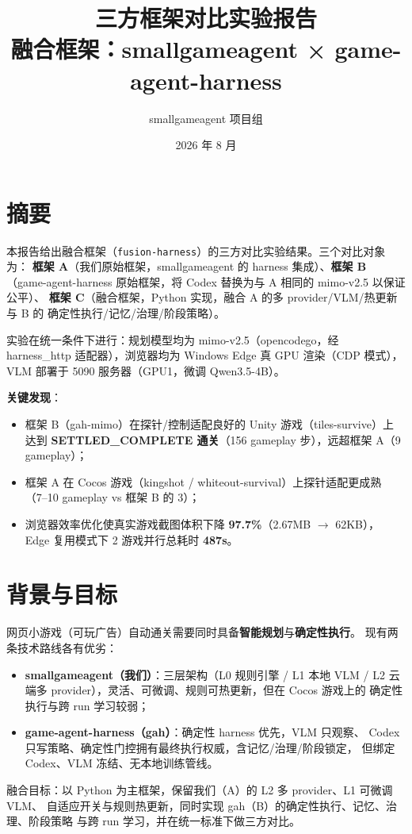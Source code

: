 \documentclass[11pt,a4paper]{article}
\title{\textbf{三方框架对比实验报告}\\ \large 融合框架：smallgameagent × game-agent-harness}
\author{smallgameagent 项目组}
\date{2026 年 8 月}
\begin{document}
\maketitle
\thispagestyle{empty}
\tableofcontents
\newpage

\section{摘要}
本报告给出融合框架（\texttt{fusion-harness}）的三方对比实验结果。三个对比对象为：
\textbf{框架 A}（我们原始框架，smallgameagent 的 harness 集成）、\textbf{框架 B}
（game-agent-harness 原始框架，将 Codex 替换为与 A 相同的 mimo-v2.5 以保证公平）、
\textbf{框架 C}（融合框架，Python 实现，融合 A 的多 provider/VLM/热更新与 B 的
确定性执行/记忆/治理/阶段策略）。

实验在统一条件下进行：规划模型均为 mimo-v2.5（opencodego，经 harness\_http
适配器），浏览器均为 Windows Edge 真 GPU 渲染（CDP 模式），VLM 部署于 5090
服务器（GPU1，微调 Qwen3.5-4B）。

\textbf{关键发现}：
\begin{itemize}[leftmargin=1.5em]
  \item 框架 B（gah-mimo）在探针/控制适配良好的 Unity 游戏（tiles-survive）上
        达到 \textbf{SETTLED\_COMPLETE 通关}（156 gameplay 步），远超框架 A（9 gameplay）；
  \item 框架 A 在 Cocos 游戏（kingshot / whiteout-survival）上探针适配更成熟
        （7--10 gameplay vs 框架 B 的 3）；
  \item 浏览器效率优化使真实游戏截图体积下降 \textbf{97.7\%}（2.67MB $\rightarrow$ 62KB），
        Edge 复用模式下 2 游戏并行总耗时 \textbf{487s}。
\end{itemize}

\section{背景与目标}
网页小游戏（可玩广告）自动通关需要同时具备\textbf{智能规划}与\textbf{确定性执行}。
现有两条技术路线各有优劣：
\begin{itemize}[leftmargin=1.5em]
  \item \textbf{smallgameagent（我们）}：三层架构（L0 规则引擎 / L1 本地 VLM /
        L2 云端多 provider），灵活、可微调、规则可热更新，但在 Cocos 游戏上的
        确定性执行与跨 run 学习较弱；
  \item \textbf{game-agent-harness（gah）}：确定性 harness 优先，VLM 只观察、
        Codex 只写策略、确定性门控拥有最终执行权威，含记忆/治理/阶段锁定，
        但绑定 Codex、VLM 冻结、无本地训练管线。
\end{itemize}
融合目标：以 Python 为主框架，保留我们（A）的 L2 多 provider、L1 可微调 VLM、
自适应开关与规则热更新，同时实现 gah（B）的确定性执行、记忆、治理、阶段策略
与跨 run 学习，并在统一标准下做三方对比。
\end{document}
